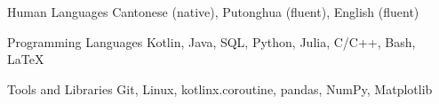 

\begin{cvskills}

  \cvskill
    {Human Languages} %
    {Cantonese (native), Putonghua (fluent), English (fluent)} %

  \cvskill
    {Programming Languages} %
    {Kotlin, Java, SQL, Python, Julia, C/C++, Bash, \LaTeX} %

  \cvskill
    {Tools and Libraries} %
    {Git, Linux, kotlinx.coroutine, pandas, NumPy, Matplotlib} %

\end{cvskills}

